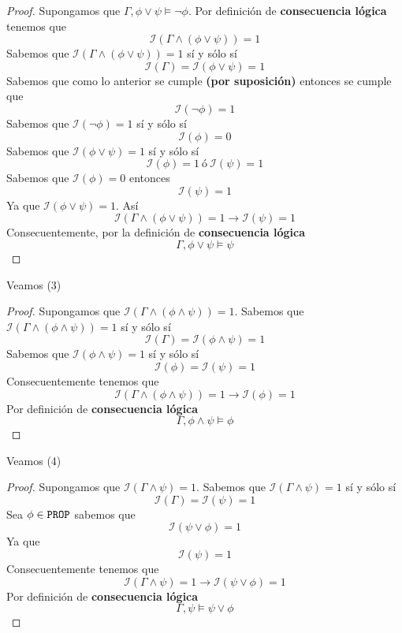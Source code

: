 \documentclass[a4paper]{article}
\begin{document}
\begin{proof}
    Supongamos que $\Gamma,\phi\lor\psi\models \neg\phi$. Por definición de \textbf{consecuencia 
    lógica} tenemos que
    \[
        \mathcal{I}\left(\Gamma \land \left(\phi\lor\psi\right)\right) = 1
    \]
    Sabemos que \(\mathcal{I}\left(\Gamma \land \left(\phi\lor\psi\right)\right) = 1\) sí y sólo sí
    \[
        \mathcal{I}\left(\Gamma\right) = \mathcal{I}\left(\phi\lor\psi\right) = 1  
    \]
    Sabemos que como lo anterior se cumple \textbf{(por suposición)} entonces se cumple que
    \[
        \mathcal{I}\left(\neg \phi\right) = 1
    \]
    Sabemos que \(\mathcal{I}\left(\neg \phi\right) = 1\) sí y sólo sí
    \[
        \mathcal{I}\left(\phi\right) = 0
    \]
    Sabemos que \(\mathcal{I}\left(\phi\lor\psi\right) = 1\) sí y sólo sí
    \[
        \mathcal{I}\left(\phi\right) = 1 \ \text{ó} \ \mathcal{I}\left(\psi\right) = 1
    \]
    Sabemos que \(\mathcal{I}\left(\phi\right) = 0\) entonces
    \[
        \mathcal{I}\left(\psi\right) = 1
    \]
    Ya que \(\mathcal{I}\left(\phi\lor\psi\right) = 1\).
    \newline
    Así 
    \[
        \mathcal{I}\left(\Gamma \land \left(\phi\lor\psi\right)\right) = 1 \to \mathcal{I}\left(\psi\right) = 1
    \]
    Consecuentemente, por la definición de \textbf{consecuencia lógica}
    \[
        \Gamma, \phi\lor\psi \models \psi
    \]
\end{proof}
Veamos (3)
\begin{proof}
    Supongamos que \(\mathcal{I}\left(\Gamma \land \left(\phi \land \psi\right)\right) = 1\). 
    \newline 
    Sabemos que \(\mathcal{I}\left(\Gamma \land \left(\phi \land \psi\right)\right) = 1\) sí y sólo sí
    \[
        \mathcal{I}\left(\Gamma \right) = 
        \mathcal{I}\left(\phi \land \psi\right) = 1
    \]
    Sabemos que \(\mathcal{I}\left(\phi \land \psi\right) = 1\) sí y sólo sí
    \[
        \mathcal{I}\left(\phi\right) = \mathcal{I}\left(\psi\right) = 1
    \]
    Consecuentemente tenemos que
    \[
        \mathcal{I}\left(\Gamma \land \left( \phi \land \psi \right)\right) = 1 \to 
        \mathcal{I}\left(\phi\right) = 1
    \]
    Por definición de \textbf{consecuencia lógica}
    \[
        \Gamma, \phi \land \psi \models \phi
    \]
\end{proof}
Veamos (4)
\begin{proof}
    Supongamos que \(\mathcal{I}\left(\Gamma \land \psi\right) = 1\). 
    \newline
    Sabemos que \(\mathcal{I}\left(\Gamma \land \psi\right) = 1\) sí y sólo sí
    \[
        \mathcal{I}\left(\Gamma\right) = \mathcal{I}\left(\psi\right) = 1
    \]
    Sea \(\phi \in \text{\texttt{PROP}}\) sabemos que 
    \[
        \mathcal{I}\left(\psi \lor \phi\right) = 1
    \]
    Ya que
    \[
        \mathcal{I}\left(\psi\right) = 1        
    \]
    Consecuentemente tenemos que
    \[
        \mathcal{I}\left(\Gamma \land \psi \right) = 1 \to 
        \mathcal{I}\left(\psi \lor \phi\right) = 1
    \]
    Por definición de \textbf{consecuencia lógica}
    \[
        \Gamma, \psi \models \psi \lor \phi
    \]
\end{proof}
\end{document}
